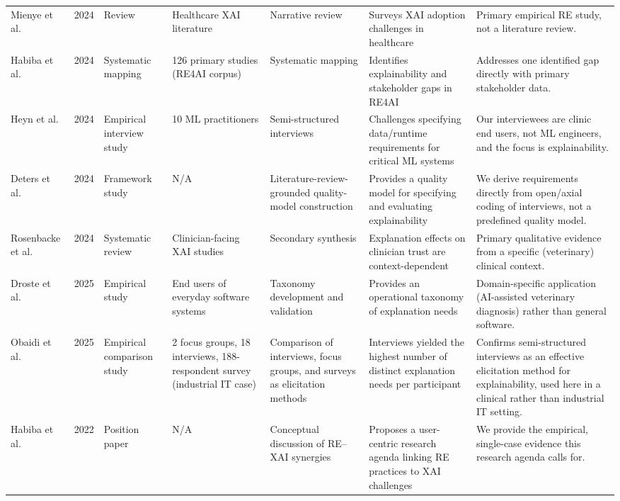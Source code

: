 \documentclass[pdflatex,sn-mathphys-num,Numbered]{sn-jnl}
\begin{document}
\begin{table}
\begin{tabular}{@{}L{2.1cm}L{0.6cm}L{1.5cm}L{2.5cm}L{2.8cm}L{3.9cm}L{3.6cm}@{}}
Mienye et al.~\cite{mienye2024} & 2024 & Review & Healthcare XAI literature & Narrative review & Surveys XAI adoption challenges in healthcare & Primary empirical RE study, not a literature review. \\
Habiba et al.~\cite{habiba2024} & 2024 & Systematic mapping & 126 primary studies (RE4AI corpus) & Systematic mapping & Identifies explainability and stakeholder gaps in RE4AI & Addresses one identified gap directly with primary stakeholder data. \\
Heyn et al.~\cite{heyn2024} & 2024 & Empirical interview study & 10 ML practitioners & Semi-structured interviews & Challenges specifying data/runtime requirements for critical ML systems & Our interviewees are clinic end users, not ML engineers, and the focus is explainability. \\
Deters et al.~\cite{deters2024} & 2024 & Framework study & N/A & Literature-review-grounded quality-model construction & Provides a quality model for specifying and evaluating explainability & We derive requirements directly from open/axial coding of interviews, not a predefined quality model. \\
Rosenbacke et al.~\cite{rosenbacke2024} & 2024 & Systematic review & Clinician-facing XAI studies & Secondary synthesis & Explanation effects on clinician trust are context-dependent & Primary qualitative evidence from a specific (veterinary) clinical context. \\
Droste et al.~\cite{droste2025} & 2025 & Empirical study & End users of everyday software systems & Taxonomy development and validation & Provides an operational taxonomy of explanation needs & Domain-specific application (AI-assisted veterinary diagnosis) rather than general software. \\
Obaidi et al.~\cite{obaidi2025} & 2025 & Empirical comparison study & 2 focus groups, 18 interviews, 188-respondent survey (industrial IT case) & Comparison of interviews, focus groups, and surveys as elicitation methods & Interviews yielded the highest number of distinct explanation needs per participant & Confirms semi-structured interviews as an effective elicitation method for explainability, used here in a clinical rather than industrial IT setting. \\
Habiba et al.~\cite{habiba2022} & 2022 & Position paper & N/A & Conceptual discussion of RE--XAI synergies & Proposes a user-centric research agenda linking RE practices to XAI challenges & We provide the empirical, single-case evidence this research agenda calls for. \\

\end{tabular}
\end{table}
\end{document}
